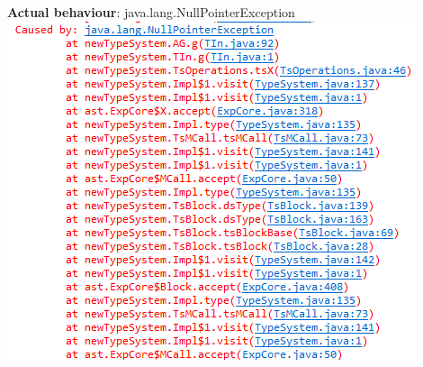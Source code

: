 \begin{appendices}
~\\
\textbf{Actual behaviour}: java.lang.NullPointerException
~\\
\includegraphics{bugReport}

\end{appendices}